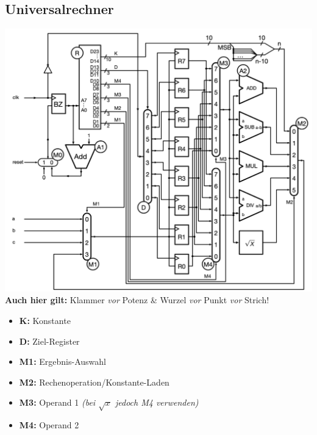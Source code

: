\documentclass[ngerman, threecolumn, 8pt]{latex4ei/latex4ei_sheet}
\begin{document}
\begin{sectionbox}
\subsection{Universalrechner}
\includegraphics[width=.9\linewidth]{img/Universalrechner.png} \\
\textbf{Auch hier gilt:} Klammer \textit{vor} Potenz \& Wurzel \textit{vor} Punkt \textit{vor} Strich!
\begin{itemize}\itemsep0pt
\item \textbf{K:} Konstante
\item \textbf{D:} Ziel-Register
\item \textbf{M1:} Ergebnis-Auswahl
\item \textbf{M2:} Rechenoperation/Konstante-Laden
\item \textbf{M3:} Operand 1 \textit{(bei $\sqrt{x}$ jedoch M4 verwenden)}
\item \textbf{M4:} Operand 2
\end{itemize}
\end{sectionbox}
\end{document}
